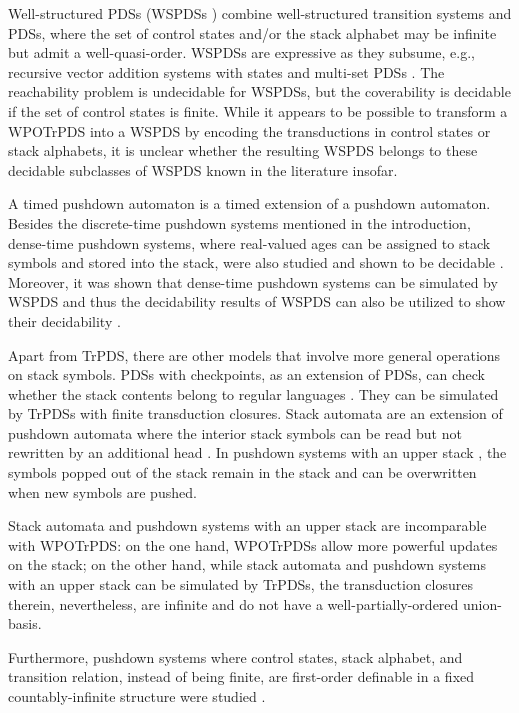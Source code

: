 \documentclass[preprint,12pt]{elsarticle}
\begin{document}
Well-structured PDSs (WSPDSs \cite{CO13}) combine well-structured transition systems and PDSs, where the set of control states and/or the stack alphabet may be infinite but admit a well-quasi-order. WSPDSs are expressive as they subsume, e.g., recursive vector addition systems with states \cite{BouajjaniE13} and multi-set PDSs \cite{SenV06}. 
The reachability problem is undecidable for WSPDSs, but the coverability is decidable if the set of control states is finite. While it appears to be possible to transform a WPOTrPDS into a WSPDS by encoding the transductions in control states or stack alphabets, it is unclear whether  
the resulting WSPDS belongs to these decidable subclasses of WSPDS known in the literature insofar.

A timed pushdown automaton is a timed extension of a pushdown automaton.  
Besides the discrete-time pushdown systems mentioned in the introduction, 
dense-time pushdown systems, where real-valued ages can be assigned to stack symbols and stored into the stack, were also studied and shown to be decidable \cite{AbdullaAS12}. Moreover, it was shown that dense-time pushdown systems can be simulated by WSPDS and thus the decidability results of WSPDS can also be utilized to show their decidability \cite{CO14}.

Apart from TrPDS, there are other models that involve more general operations on stack symbols. 
PDSs with checkpoints, as an extension of PDSs, can check whether the stack contents belong to regular languages \cite{EsparzaKS03}. They can be simulated by TrPDSs with finite transduction closures.
%
Stack automata are an extension of pushdown automata where %
the interior stack symbols can be read but not rewritten by an additional head \cite{GGH67}. 
%
In pushdown systems with an upper stack \cite{PDT17}, 
the symbols popped out of the stack remain in the stack and can be overwritten when new symbols are pushed.

Stack automata and pushdown systems with an upper stack are incomparable with WPOTrPDS: on the one hand, WPOTrPDSs allow more powerful updates on the stack; on the other hand, while stack automata and pushdown systems with an upper stack can be simulated by TrPDSs, the transduction closures therein, nevertheless, are infinite and do not have a well-partially-ordered union-basis.

Furthermore, pushdown systems where control states, stack alphabet, and transition relation, instead of being finite, are first-order definable in a fixed countably-infinite structure were studied \cite{ClementeL15}.   
\end{document}
